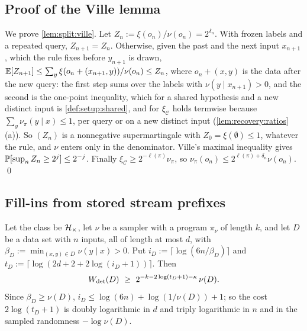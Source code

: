 \subsection{Proof of the Ville lemma}\label{app:split:ville}

We prove \cref{lem:split:ville}. Let $Z_n:=\xi(o_n)/\nu(o_n)=2^{\delta_n}$. With frozen labels and a repeated query, $Z_{n+1}=Z_n$. Otherwise, given the past and the next input $x_{n+1}$, which the rule fixes before $y_{n+1}$ is drawn, $\mathbb{E}[Z_{n+1}]\le\sum_y\xi(o_n+(x_{n+1},y))/\nu(o_n)\le Z_n$, where $o_n+(x,y)$ is the data after the new query: the first step sums over the labels with $\nu(y\mid x_{n+1})>0$, and the second is the one-point inequality, which for a shared hypothesis and a new distinct input is \cref{def:setup:shared}, and for $\xi_{\mathcal C}$ holds termwise because $\sum_y\nu_\pi(y\mid x)\le1$, per query or on a new distinct input (\cref{lem:recovery:ratios}(a)). So $(Z_n)$ is a nonnegative supermartingale with $Z_0=\xi(\emptyset)\le1$, whatever the rule, and $\nu$ enters only in the denominator. Ville's maximal inequality \citep{ville1939etude} gives $\mathbb{P}[\sup_nZ_n\ge2^j]\le2^{-j}$. Finally $\xi_{\mathcal C}\ge2^{-\ell(\pi)}\nu_\pi$, so $\nu_\pi(o_n)\le2^{\ell(\pi)+\delta_n}\nu(o_n)$. \qed

\subsection{Fill-ins from stored stream prefixes}\label{app:split:stream}

\begin{lemma}\label{lem:split:stream}
Let the class be $\mathcal{H}_{\times}$, let $\nu$ be a sampler with a program $\pi_\nu$ of length $k$, and let $D$ be a data set with $n$ inputs, all of length at most $d$, with $\beta_D:=\min_{(x,y)\in D}\nu(y\mid x)>0$. Put $i_D:=\lceil\log(6n/\beta_D)\rceil$ and $t_D:=\lceil\log(2d+2+2\log(i_D+1))\rceil$. Then
\[
\Wdet(D)\ \ge\ 2^{-k-2\log(t_D+1)-\kappa}\,\nu(D).
\]
Since $\beta_D\ge\nu(D)$, $i_D\le\log(6n)+\log(1/\nu(D))+1$; so the cost $2\log(t_D+1)$ is doubly logarithmic in $d$ and triply logarithmic in $n$ and in the sampled randomness $-\log\nu(D)$.
\end{lemma}

